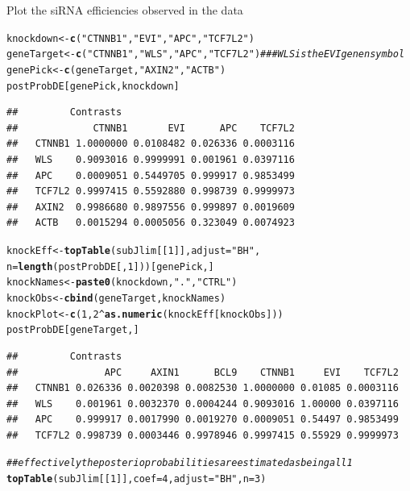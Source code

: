 \documentclass[a4paper]{article}
\makeatletter
\newcommand{\hlnum}[1]{\textcolor[rgb]{0.686,0.059,0.569}{#1}}%
\newcommand{\hlstr}[1]{\textcolor[rgb]{0.192,0.494,0.8}{#1}}%
\newcommand{\hlcom}[1]{\textcolor[rgb]{0.678,0.584,0.686}{\textit{#1}}}%
\newcommand{\hlopt}[1]{\textcolor[rgb]{0,0,0}{#1}}%
\newcommand{\hlstd}[1]{\textcolor[rgb]{0.345,0.345,0.345}{#1}}%
\newcommand{\hlkwb}[1]{\textcolor[rgb]{0.69,0.353,0.396}{#1}}%
\newcommand{\hlkwc}[1]{\textcolor[rgb]{0.333,0.667,0.333}{#1}}%
\newcommand{\hlkwd}[1]{\textcolor[rgb]{0.737,0.353,0.396}{\textbf{#1}}}%
\newenvironment{kframe}{%
 \def\at@end@of@kframe{}%
 \ifinner\ifhmode%
  \def\at@end@of@kframe{\end{minipage}}%
  \begin{minipage}{\columnwidth}%
 \fi\fi%
 \def\FrameCommand##1{\hskip\@totalleftmargin \hskip-\fboxsep
 \colorbox{shadecolor}{##1}\hskip-\fboxsep
     \hskip-\linewidth \hskip-\@totalleftmargin \hskip\columnwidth}%
 \MakeFramed {\advance\hsize-\width
   \@totalleftmargin\z@ \linewidth\hsize
   \@setminipage}}%
 {\par\unskip\endMakeFramed%
 \at@end@of@kframe}
\newenvironment{knitrout}{}{} %
\makeatother
\begin{document}
Plot the siRNA efficiencies observed in the data
\begin{knitrout}
\color{fgcolor}\begin{kframe}
\begin{alltt}
\hlstd{knockdown} \hlkwb{<-} \hlkwd{c}\hlstd{(}\hlstr{"CTNNB1"}\hlstd{,} \hlstr{"EVI"}\hlstd{,} \hlstr{"APC"}\hlstd{,} \hlstr{"TCF7L2"}\hlstd{)}
\hlstd{geneTarget} \hlkwb{<-} \hlkwd{c}\hlstd{(}\hlstr{"CTNNB1"}\hlstd{,} \hlstr{"WLS"}\hlstd{,} \hlstr{"APC"}\hlstd{,} \hlstr{"TCF7L2"}\hlstd{)} \hlcom{### WLS is the EVI genen symbol}
\hlstd{genePick} \hlkwb{<-} \hlkwd{c}\hlstd{(geneTarget,}\hlstr{"AXIN2"}\hlstd{,} \hlstr{"ACTB"}\hlstd{)}
\hlstd{postProbDE[genePick, knockdown]}
\end{alltt}
\begin{verbatim}
##         Contrasts
##             CTNNB1       EVI      APC    TCF7L2
##   CTNNB1 1.0000000 0.0108482 0.026336 0.0003116
##   WLS    0.9093016 0.9999991 0.001961 0.0397116
##   APC    0.0009051 0.5449705 0.999917 0.9853499
##   TCF7L2 0.9997415 0.5592880 0.998739 0.9999973
##   AXIN2  0.9986680 0.9897556 0.999897 0.0019609
##   ACTB   0.0015294 0.0005056 0.323049 0.0074923
\end{verbatim}
\begin{alltt}
\hlstd{knockEff} \hlkwb{<-} \hlkwd{topTable}\hlstd{(subJlim[[}\hlnum{1}\hlstd{]],} \hlkwc{adjust}\hlstd{=}\hlstr{"BH"}\hlstd{,}
                     \hlkwc{n}\hlstd{=}\hlkwd{length}\hlstd{(postProbDE[,}\hlnum{1}\hlstd{]))[genePick,]}
\hlstd{knockNames} \hlkwb{<-} \hlkwd{paste0}\hlstd{(knockdown,}\hlstr{"."}\hlstd{,}\hlstr{"CTRL"}\hlstd{)}
\hlstd{knockObs} \hlkwb{<-} \hlkwd{cbind}\hlstd{(geneTarget, knockNames)}
\hlstd{knockPlot} \hlkwb{<-} \hlkwd{c}\hlstd{(}\hlnum{1}\hlstd{,}\hlnum{2}\hlopt{^}\hlkwd{as.numeric}\hlstd{(knockEff[knockObs]))}
\hlstd{postProbDE[geneTarget,]}
\end{alltt}
\begin{verbatim}
##         Contrasts
##               APC     AXIN1      BCL9    CTNNB1     EVI    TCF7L2
##   CTNNB1 0.026336 0.0020398 0.0082530 1.0000000 0.01085 0.0003116
##   WLS    0.001961 0.0032370 0.0004244 0.9093016 1.00000 0.0397116
##   APC    0.999917 0.0017990 0.0019270 0.0009051 0.54497 0.9853499
##   TCF7L2 0.998739 0.0003446 0.9978946 0.9997415 0.55929 0.9999973
\end{verbatim}
\begin{alltt}
\hlcom{## effectively the posterio probabilities are estimated as being all 1}
\hlkwd{topTable}\hlstd{(subJlim[[}\hlnum{1}\hlstd{]],} \hlkwc{coef}\hlstd{=}\hlnum{4}\hlstd{,} \hlkwc{adjust}\hlstd{=}\hlstr{"BH"}\hlstd{,} \hlkwc{n}\hlstd{=}\hlnum{3}\hlstd{)}

\end{alltt}
\end{kframe}
\end{knitrout}
\end{document}
